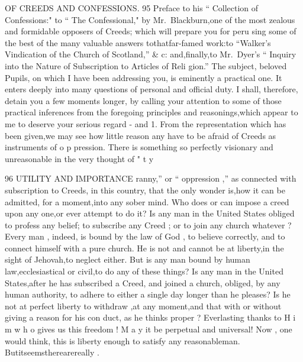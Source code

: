 \documentclass[
]{book}
\begin{document}
OF CREEDS AND CONFESSIONS. 95
Preface to his `` Collection of Confessions:" to
`` The Confessional," by Mr.~Blackburn,one of the most zealous and formidable opposers
of Creeds; which will prepare you for peru sing some of the best of the many valuable answers tothatfar-famed work:to ``Walker's Vindication of the Church of Scotland,'' \& c: and,finally,to Mr.~Dyer's `` Inquiry into the Nature of Subscription to Articles of Reli
gion.''
The subject, beloved Pupils, on which I have been addressing you, is eminently a practical one. It enters deeply into many questions of personal and official duty. I shall, therefore, detain you a few moments longer, by calling your attention to some of those practical inferences from the foregoing principles and reasonings,which appear to me to deserve your serious regard - and
1. From the representation which has been
given,we may see how little reason any have to be afraid of Creeds as instruments of o p
pression.
There is something so perfectly visionary and unreasonable in the very thought of " t y

96 UTILITY AND IMPORTANCE
ranny,'' or `` oppression ,'' as connected with
subscription to Creeds, in this country, that
the only wonder is,how it can be admitted, for a moment,into any sober mind. Who
does or can impose a creed upon any one,or ever attempt to do it? Is any man in the
United States obliged to profess any belief; to subscribe any Creed ; or to join any church
whatever ? Every man , indeed, is bound by the law of God , to believe correctly, and to connect himself with a pure church. He is
not and cannot be at liberty,in the sight of
Jehovah,to neglect either. But is any man
bound by human law,ecclesiastical or civil,to
do any of these things? Is any man in the
United States,after he has subscribed a Creed,
and joined a church, obliged, by any human
authority, to adhere to either a single day
longer than he pleases? Is he not at perfect
liberty to withdraw ,at any moment,and that
with or without giving a reason for his con duct, as he thinks proper ? Everlasting thanks
to H i m w h o gives us this freedom ! M a y it be perpetual and universal! Now , one would
think, this is liberty enough to satisfy any reasonableman. Butitseemstherearereally
.
\end{document}
